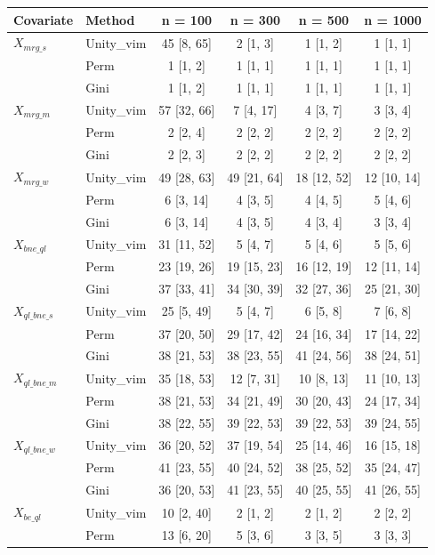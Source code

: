 
\begin{tabular}{llcccc}
\toprule
Covariate & Method & n = 100 & n = 300 & n = 500 & n = 1000\\
\midrule
$X_{mrg\_s}$ & Unity\_vim & 45 [8, 65] & 2 [1, 3] & 1 [1, 2] & 1 [1, 1]\\
 & Perm & 1 [1, 2] & 1 [1, 1] & 1 [1, 1] & 1 [1, 1]\\
 & Gini & 1 [1, 2] & 1 [1, 1] & 1 [1, 1] & 1 [1, 1]\\
$X_{mrg\_m}$ & Unity\_vim & 57 [32, 66] & 7 [4, 17] & 4 [3, 7] & 3 [3, 4]\\
 & Perm & 2 [2, 4] & 2 [2, 2] & 2 [2, 2] & 2 [2, 2]\\
 & Gini & 2 [2, 3] & 2 [2, 2] & 2 [2, 2] & 2 [2, 2]\\
$X_{mrg\_w}$ & Unity\_vim & 49 [28, 63] & 49 [21, 64] & 18 [12, 52] & 12 [10, 14]\\
 & Perm & 6 [3, 14] & 4 [3, 5] & 4 [4, 5] & 5 [4, 6]\\
 & Gini & 6 [3, 14] & 4 [3, 5] & 4 [3, 4] & 3 [3, 4]\\
$X_{bne\_ql}$ & Unity\_vim & 31 [11, 52] & 5 [4, 7] & 5 [4, 6] & 5 [5, 6]\\
 & Perm & 23 [19, 26] & 19 [15, 23] & 16 [12, 19] & 12 [11, 14]\\
 & Gini & 37 [33, 41] & 34 [30, 39] & 32 [27, 36] & 25 [21, 30]\\
$X_{ql\_bne\_s}$ & Unity\_vim & 25 [5, 49] & 5 [4, 7] & 6 [5, 8] & 7 [6, 8]\\
 & Perm & 37 [20, 50] & 29 [17, 42] & 24 [16, 34] & 17 [14, 22]\\
 & Gini & 38 [21, 53] & 38 [23, 55] & 41 [24, 56] & 38 [24, 51]\\
$X_{ql\_bne\_m}$ & Unity\_vim & 35 [18, 53] & 12 [7, 31] & 10 [8, 13] & 11 [10, 13]\\
 & Perm & 38 [21, 53] & 34 [21, 49] & 30 [20, 43] & 24 [17, 34]\\
 & Gini & 38 [22, 55] & 39 [22, 53] & 39 [22, 53] & 39 [24, 55]\\
$X_{ql\_bne\_w}$ & Unity\_vim & 36 [20, 52] & 37 [19, 54] & 25 [14, 46] & 16 [15, 18]\\
 & Perm & 41 [23, 55] & 40 [24, 52] & 38 [25, 52] & 35 [24, 47]\\
 & Gini & 36 [20, 53] & 41 [23, 55] & 40 [25, 55] & 41 [26, 55]\\
$X_{be\_ql}$ & Unity\_vim & 10 [2, 40] & 2 [1, 2] & 2 [1, 2] & 2 [2, 2]\\
 & Perm & 13 [6, 20] & 5 [3, 6] & 3 [3, 5] & 3 [3, 3]\\

\end{tabular}
